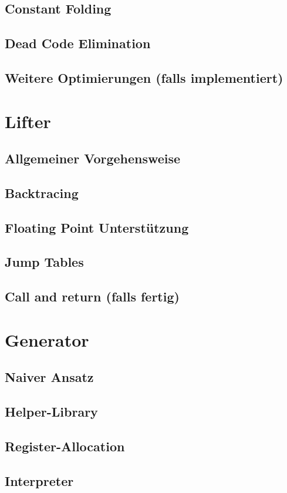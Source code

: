 \documentclass[course=eragp]{aspdoc}
\begin{document}
\subsection{Constant Folding}
\subsection{Dead Code Elimination}
\subsection{Weitere Optimierungen (falls implementiert)}

\section{Lifter}
\subsection{Allgemeiner Vorgehensweise}
\subsection{Backtracing}
\subsection{Floating Point Unterstützung}
\subsection{Jump Tables}
\subsection{Call and return (falls fertig)}


\section{Generator}
\subsection{Naiver Ansatz}
\subsection{Helper-Library}
\subsection{Register-Allocation}
\subsection{Interpreter}
\end{document}
